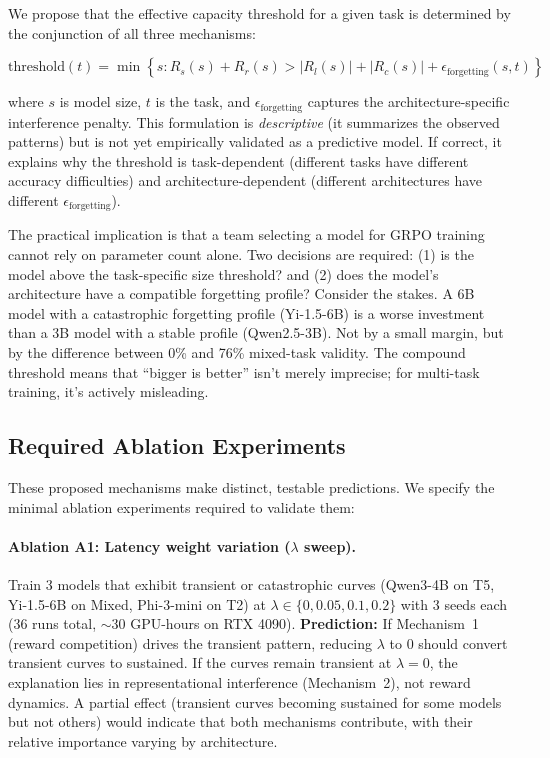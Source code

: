 \documentclass[11pt]{article}
\begin{document}
We propose that the effective capacity threshold for a given task is determined by the conjunction of all three mechanisms:

\begin{equation}
\text{threshold}(t) = \min\left\{s : R_s(s) + R_r(s) > |R_l(s)| + |R_c(s)| + \epsilon_{\text{forgetting}}(s, t)\right\}
\end{equation}

where $s$ is model size, $t$ is the task, and $\epsilon_{\text{forgetting}}$ captures the architecture-specific interference penalty.  This formulation is \emph{descriptive} (it summarizes the observed patterns) but is not yet empirically validated as a predictive model.  If correct, it explains why the threshold is task-dependent (different tasks have different accuracy difficulties) and architecture-dependent (different architectures have different $\epsilon_{\text{forgetting}}$).

The practical implication is that a team selecting a model for GRPO training cannot rely on parameter count alone.  Two decisions are required: (1) is the model above the task-specific size threshold? and (2) does the model's architecture have a compatible forgetting profile?  Consider the stakes.  A 6B model with a catastrophic forgetting profile (Yi-1.5-6B) is a worse investment than a 3B model with a stable profile (Qwen2.5-3B).  Not by a small margin, but by the difference between 0\% and 76\% mixed-task validity.  The compound threshold means that ``bigger is better'' isn't merely imprecise; for multi-task training, it's actively misleading.

\subsection{Required Ablation Experiments}
\label{sec:ablation-plan}

These proposed mechanisms make distinct, testable predictions.  We specify the minimal ablation experiments required to validate them:

\paragraph{Ablation A1: Latency weight variation ($\lambda$ sweep).}
Train 3 models that exhibit transient or catastrophic curves (Qwen3-4B on T5, Yi-1.5-6B on Mixed, Phi-3-mini on T2) at $\lambda \in \{0, 0.05, 0.1, 0.2\}$ with 3 seeds each (36 runs total, $\sim$30 GPU-hours on RTX 4090).  \textbf{Prediction:} If Mechanism~1 (reward competition) drives the transient pattern, reducing $\lambda$ to 0 should convert transient curves to sustained.  If the curves remain transient at $\lambda = 0$, the explanation lies in representational interference (Mechanism~2), not reward dynamics.  A partial effect (transient curves becoming sustained for some models but not others) would indicate that both mechanisms contribute, with their relative importance varying by architecture.
\end{document}
